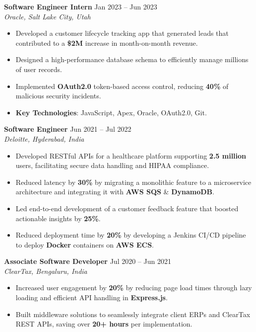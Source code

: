\documentclass[letterpaper,10pt]{article}
\begin{document}
\vspace{2pt}
\textbf{Software Engineer Intern} \hfill Jan 2023 -- Jun 2023\\
\textit{Oracle, Salt Lake City, Utah}
\begin{itemize}
  \item Developed a customer lifecycle tracking app that generated leads that contributed to a \textbf{\$2M} increase in month-on-month revenue.
  \item Designed a high-performance database schema to efficiently manage millions of user records.
  \item Implemented \textbf{OAuth2.0} token-based access control, reducing \textbf{40\%} of malicious security incidents.
  \item \textbf{Key Technologies}: JavaScript, Apex, Oracle, OAuth2.0, Git.
\end{itemize}

\vspace{2pt}
\textbf{Software Engineer} \hfill Jun 2021 -- Jul 2022\\
\textit{Deloitte, Hyderabad, India}
\begin{itemize}
  \item Developed RESTful APIs for a healthcare platform supporting \textbf{2.5 million} users, facilitating secure data handling and HIPAA compliance.
  \item Reduced latency by \textbf{30\%} by migrating a monolithic feature to a microservice architecture and integrating it with \textbf{AWS SQS} \& \textbf{DynamoDB}.
  \item Led end-to-end development of a customer feedback feature that boosted actionable insights by \textbf{25\%}.
  \item Reduced deployment time by \textbf{20\%} by developing a Jenkins CI/CD pipeline to deploy \textbf{Docker} containers on \textbf{AWS ECS}.
\end{itemize}

\vspace{2pt}
\textbf{Associate Software Developer} \hfill Jul 2020 -- Jun 2021\\
\textit{ClearTax, Bengaluru, India}
\begin{itemize}
  \item Increased user engagement by \textbf{20\%} by reducing page load times through lazy loading and efficient API handling in \textbf{Express.js}.
  \item Built middleware solutions to seamlessly integrate client ERPs and ClearTax REST APIs, saving over \textbf{20+ hours} per implementation.
\end{itemize}
\end{document}

